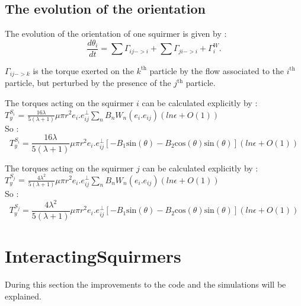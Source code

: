 \documentclass{article}
\begin{document}
\subsection{The evolution of the orientation}
The evolution of the orientation of one squirmer is given by : 
$$
\frac{d \theta_i}{dt} = \sum \Gamma_{ij->i} + \sum \Gamma_{ji->i} +  \Gamma_{i}^W.
$$

$\Gamma_{ij->k}$ is the torque exerted on the $k^\mathrm{th}$ particle by the flow associated to the $i^\mathrm{th}$ particle, but perturbed by the presence of the $j^\mathrm{th}$ particle.\\

\vspace{0.5cm}

The torques acting on the squirmer $i$ can be calculated explicitly by : \\
$T_y^{S_i}$ = $\frac{16 \lambda}{5(\lambda +1)} \mu \pi r^2 e_i.e^{\perp}_{ij}\sum_{n} B_n W_n(e_i.e_{ij}) (ln \epsilon + O(1))$ \cite{Brumley}
\\ So :
\begin{equation*}
    \boxed{T_y^{S_i} = \frac{16 \lambda}{5(\lambda +1)} \mu \pi r^2 e_i.e^{\perp}_{ij}\left[-B_1\mathrm{sin}(\theta) -B_2\mathrm{cos}(\theta)\mathrm{sin}(\theta) \right] (ln \epsilon + O(1))}
\end{equation*}

The torques acting on the squirmer $j$ can be calculated explicitly by : \\
$T_y^{S_j}$ = $\frac{4 \lambda^2}{5(\lambda +1)} \mu \pi r^2 e_i.e^{\perp}_{ij}\sum_{n} B_n W_n(e_i.e_{ij}) (ln \epsilon + O(1))$ \cite{Brumley}
\\ So :
\begin{equation*}
    \boxed{T_y^{S_j} = \frac{4 \lambda^2}{5(\lambda +1)} \mu \pi r^2 e_i.e^{\perp}_{ij}\left[-B_1\mathrm{sin}(\theta) -B_2\mathrm{cos}(\theta)\mathrm{sin}(\theta) \right] (ln \epsilon + O(1))}
\end{equation*}


\section{InteractingSquirmers}
During this section the improvements to the code and the simulations will be explained.\\
\end{document}
